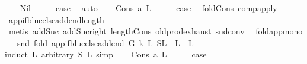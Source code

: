 \begin{isabellebody}
\ \ \isamarkupfalse%
\ Nil\isanewline
\ \ \isamarkupfalse%
\ \isamarkupfalse%
\ {\isacharquery}{\kern0pt}case\ \isamarkupfalse%
\ auto\isanewline
{}\isamarkupfalse%
\isanewline
\ \ \isamarkupfalse%
\ {\isacharparenleft}{\kern0pt}Cons\ a\ L{}{\isacharparenright}{\kern0pt}\isanewline
\ \ \isamarkupfalse%
\ \isamarkupfalse%
\ {\isacharquery}{\kern0pt}case\ \isamarkupfalse%
\ fold{\isacharunderscore}{\kern0pt}Cons\ comp{\isacharunderscore}{\kern0pt}apply\ \isamarkupfalse%
\ app{\isacharunderscore}{\kern0pt}if{\isacharunderscore}{\kern0pt}blue{\isacharunderscore}{\kern0pt}else{\isacharunderscore}{\kern0pt}add{\isacharunderscore}{\kern0pt}end{\isacharunderscore}{\kern0pt}length\isanewline
\ \ \ \ \isamarkupfalse%
\ {\isacharparenleft}{\kern0pt}metis\ add{\isacharunderscore}{\kern0pt}Suc\ add{\isacharunderscore}{\kern0pt}Suc{\isacharunderscore}{\kern0pt}right\ length{\isacharunderscore}{\kern0pt}Cons\ old{\isachardot}{\kern0pt}prod{\isachardot}{\kern0pt}exhaust\ snd{\isacharunderscore}{\kern0pt}conv{\isacharparenright}{\kern0pt}\ \isanewline
{}\isamarkupfalse%
%
\endisatagproof
{\isafoldproof}%
%
\isadelimproof
\isanewline
%
\endisadelimproof
\isanewline
{}\isamarkupfalse%
\ fold{\isacharunderscore}{\kern0pt}app{\isacharunderscore}{\kern0pt}mono{\isacharcolon}{\kern0pt}\isanewline
\ \ \ {\isachardoublequoteopen}snd\ {\isacharparenleft}{\kern0pt}fold\ {\isacharparenleft}{\kern0pt}app{\isacharunderscore}{\kern0pt}if{\isacharunderscore}{\kern0pt}blue{\isacharunderscore}{\kern0pt}else{\isacharunderscore}{\kern0pt}add{\isacharunderscore}{\kern0pt}end\ G\ k{\isacharparenright}{\kern0pt}\ L{}\ {\isacharparenleft}{\kern0pt}S{\isacharcomma}{\kern0pt}L{}{\isacharparenright}{\kern0pt}{\isacharparenright}{\kern0pt}\ {\isacharequal}{\kern0pt}\ L{}\ {\isacharat}{\kern0pt}\ L{}\ {\isachardoublequoteclose}\isanewline
%
\isadelimproof
%
\endisadelimproof
%
\isatagproof
{}\isamarkupfalse%
{\isacharparenleft}{\kern0pt}induct\ L{}\ arbitrary{\isacharcolon}{\kern0pt}\ S\ L{}{\isacharcomma}{\kern0pt}\ simp{\isacharparenright}{\kern0pt}\isanewline
\ \ \isamarkupfalse%
\ {\isacharparenleft}{\kern0pt}Cons\ a\ L{}{\isacharparenright}{\kern0pt}\isanewline
\ \ \isamarkupfalse%
\ \isamarkupfalse%
\ {\isacharquery}{\kern0pt}case\ \isamarkupfalse%

\end{isabellebody}
